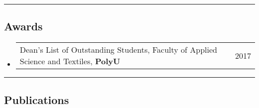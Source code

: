 \documentclass[10pt,a4paper]{article}
\makeatletter
\newcommand{\headerrow}[2]
{\begin{tabular*}{\linewidth}{l@{\extracolsep{\fill}}r}
	#1 &
	#2 \\
\end{tabular*}}
\makeatother
\begin{document}





	



\hrule
\vspace{-1em}
\subsection*{Awards}

\begin{itemize}
	\parskip=0.1em
		\item
		\headerrow
			{Dean’s List of Outstanding Students, Faculty of Applied Science and Textiles, \textbf{PolyU}}
			{2017}



\end{itemize}



\hrule
\vspace{-1em}
\subsection*{Publications}
\end{document}
